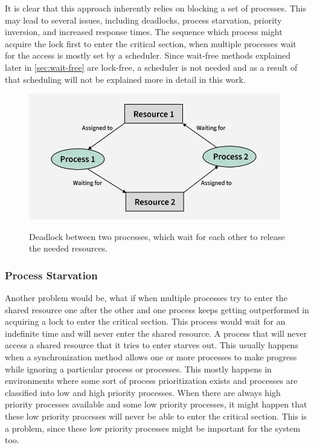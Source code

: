 It is clear that this approach inherently relies on blocking a set of processes. This may lead to several issues, including deadlocks, process starvation, priority inversion, and increased response times. The sequence which process might acquire the lock first to enter the critical section, when multiple processes wait for the access is mostly set by a scheduler. Since wait-free methods explained later in \cref{sec:wait-free} are lock-free, a scheduler is not needed and as a result of that scheduling will not be explained more in detail in this work. \cite{brandenburg2019multiprocessorrealtimelockingprotocols,MutexSemaphoreIPC}

\begin{figure}[!ht]
    \centering
    \captionsetup{justification=centering}
    \caption{Deadlock between two processes, which wait for each other to release the needed resources.}
    \includegraphics[width=110mm]{images/deadlock.png}
    \cite{Deadlock}
    \label{fig:deadlock}
\end{figure}

\subsubsection{Process Starvation}\label{subsubsec:process-starvation}

Another problem would be, what if when multiple processes try to enter the shared resource one after the other and one process keeps getting outperformed in acquiring a lock to enter the critical section. This process would wait for an indefinite time and will never enter the shared resource. A process that will never access a shared resource that it tries to enter starves out. This usually happens when a synchronization method allows one or more processes to make progress while ignoring a particular process or processes. This mostly happens in environments where some sort of process prioritization exists and processes are classified into low and high priority processes. When there are always high priority processes available and some low priority processes, it might happen that these low priority processes will never be able to enter the critical section. This is a problem, since these low priority processes might be important for the system too. \cite{Starvation}

